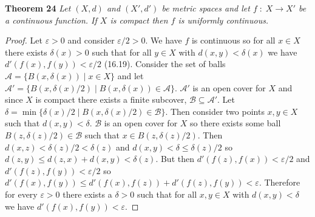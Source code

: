 \documentclass{article}
\begin{document}
\begin{flushleft}
\textbf{Theorem 24}
\textsl{Let $(X,d)$ and $(X',d')$ be metric spaces and let $f \; : \; X \rightarrow X'$ be a continuous function. If $X$ is compact then $f$ is uniformly continuous.}
\begin{proof}
Let $\varepsilon > 0$ and consider $\varepsilon/2 > 0$. We have $f$ is continuous so for all $x \in X$ there exists $\delta (x) > 0$ such that for all $y \in X$ with $d(x,y) < \delta (x)$ we have $d'(f(x),f(y)) < \varepsilon/2$ (16.19). Consider the set of balls $\mathcal{A} = \{B(x, \delta (x)) \mid x\in X\}$ and let $\mathcal{A}' = \{B(x, \delta(x)/2) \mid B(x, \delta(x)) \in \mathcal{A}\}$. $\mathcal{A}'$ is an open cover for $X$ and since $X$ is compact there exists a finite subcover, $\mathcal{B} \subseteq \mathcal{A}'$. Let $\delta = \min \{\delta(x)/2 \mid B(x, \delta(x)/2) \in \mathcal{B} \}$. Then consider two points $x,y \in X$ such that $d(x,y) < \delta$. $\mathcal{B}$ is an open cover for $X$ so there exists some ball $B(z, \delta(z)/2) \in \mathcal{B}$ such that $x \in B(z, \delta(z)/2)$. Then $d(x,z) < \delta(z)/2 < \delta(z)$ and $d(x,y) < \delta \leq \delta(z)/2$ so $d(z,y) \leq d(z,x) + d(x,y) < \delta(z)$. But then $d'(f(z),f(x)) < \varepsilon/2$ and $d'(f(z),f(y)) < \varepsilon/2$ so $d'(f(x),f(y)) \leq d'(f(x),f(z)) + d'(f(z),f(y)) < \varepsilon$. Therefore for every $\varepsilon > 0$ there exists a $\delta > 0$ such that for all $x,y \in X$ with $d(x,y) < \delta$ we have $d'(f(x),f(y)) < \varepsilon$.
\end{proof}

\end{flushleft}
\end{document}
